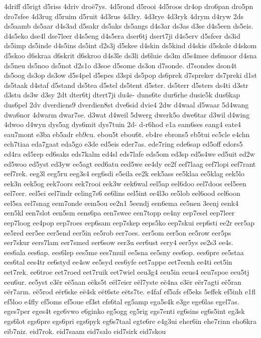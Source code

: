 {4driff
d5rigt
d5riss
4driv
droë7ys.
4d5rond
d5rooi
4d5roos
dr4op
dro6pan
dro5pn
dro7sfee
4d3rug
d5ruim
d5ruit
4d3rus
4d3ry.
4d3rye
4d3ryk
4drym
d4ryw
2ds
ds5aamb
ds5aar
d4s3ad
d5sakr
ds5aks
ds5angs
d4s3ar
ds3as
d3se
d4s5een
ds5eis.
d4s5eko
dse4l
dse7leer
d4s5eng
d4s5era
dser6tj
dsert7ji
d4s5erv
d5sfeer
ds3id
ds5imp
ds5inde
d4s5ins
ds5int
d2s3j
d5skee
d4skin
ds5kind
d4skis
d5skole
d4skom
d5skoo
d6skraa
d6skrit
d6skroo
d4s3le
ds3li
ds6luie
ds3m
d5s4mee
ds6moor
d4sna
ds5neu
ds5noo
ds5not
d2s1o
d3soe
d5some
ds3on
d7sonde.
d7sondes
dson4t
ds5oog
ds3op
ds3ow
d5s4pel
d5spes
d3spi
ds5pop
ds6prek
d7spreker
ds7preki
d1st
ds5taak
d4staf
d5stand
ds5tea
d5stel
ds5tent
d5ster.
ds5terr
d5sters
ds4ti
d3str
d3stu
ds3w
d3sy
2dt
dter6tj
dtert7ji
du4e-
duns6te
dur6rhe
dusie5k
dus6kap
dus6pel
2dv
dverdiens9
dverdien8st
dve6sid
dvie4
2dw
d4waal
d5waar
5d4wang
dwa6nor
4dwarm
dwar7se.
d3wat
d4weil
5dwerg
dwerk5o
dwe6tar
d3wil
d4wing
4dwoo
d4wyn
dys5ag
dys6mit
dys7tuin
2d-
d-r6hod
e1a
eam6ses
eang4
eate4
eau7mont
e3ba
eb5adr
eb9cu.
ebou5t
ebou6t.
eb4re
ebrons5
eb5tui
ec5cle
e4chn
ech7tiaa
eda7gaat
eda5go
e3de
ed5eis
eder7as.
ede7ring
ede6sap
ed5off
edors5
ed4ra
ed5rep
ed6saks
eds7kalm
ed4sl
eds7lafe
eds5om
ed3sp
ed5s4we
ed5uit
ed2w
ed5woo
ed5yst
ed3yw
ee5agt
eed6atu
eed5we
ee4dy
ee2f
eef7laag
eef7lopi
eef7rant
eef7rek.
eeg3l
eeg5ru
eeg3s4
eeg6sdi
e5eila
ee2k
eek5ass
ee5klaa
ee5klag
eek5lo
eek3n
eek5og
eek7oors
eek7rooi
eek3w
eek6wal
eel5ap
eel6doo
eel7doos
eel5een
eel7eer.
eel5ei
eel7indr
eeling7s6
ee6lins
eel5int
ee4l3o
ee5lob
eel6ood
eel6oon
eel5sa
eel7snag
eem7onde
eem5ou
ee2n1
5eendj
een6ema
ee5nen
3eenj
eenk4
een5kl
een7slot
een5sm
eens6pa
een7swee
een7topp
ee4ny
eep7esel
eep7leer
eep7loog
ee4pop
eep7roes
eep6sam
eep7skep
eeps5ko
eep7skui
eep6sti
ee2r
eer5ap
ee5red
eer5ee
eer5end
eer5in
ee5rob
eer7oes.
eer5om
eer5on
ee5row
eer5ps
eer7skur
eers7lam
eer7smed
eer6sow
eer3u
eer6ust
eery4
eer5ys
ee2s3
ee4s.
ees6ala
ees6ap.
ees6lep
ees5me
ees7muil
ee5sna
ee5sny
ees6op.
ees6pre
ee5staa
ees6tal
ees4tr
ee6styd
ee4sw
ee5syd
ees6yfe
eet7appe
eet7eenh
ee4ti
eet5in
eet7rek.
ee6troe
eet7roed
eet7ruik
eet7wiel
eeu3g4
eeu5in
eeus4
eeu7spoe
eeu5tj
eeu6ur.
ee5yst
e3êr
eë5aan
eëks5t
eël7eier
eël7yste
eë4na
e3ër
eër7agti
eë5ran
eër7arm.
eë5rod
eër6ske
eë4sk
eët6ste
eëts7te.
e4faf
ef5afs
ef5eks
5effek
ef5inh
e1fl
ef5loo
e4fly
ef5oms
ef5oue
ef3st
efs6tal
eg5amp
ega5s4k
e3ge
ege6las
egel7as.
eges7per
eges4t
ege6vwo
e6ginko
eg5ogg
eg5rig
egs7enti
eg6sins
eg6s5int
eg3sk
egs6lot
egs6pre
egs6pri
egs6pyk
eg6s7taal
egte6re
e4g3ui
eher6in
ehe7rinn
eho6kra
eib7niz.
eid7rok.
eid7saam
eid7salo
eid7sirk
eid7skou
}
